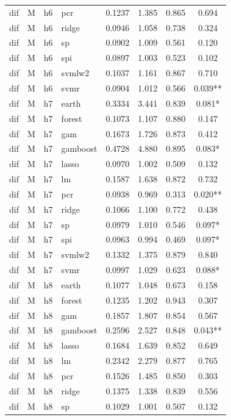 \begin{ThreePartTable}
\begin{longtable}[t]{llclcccc}
dif & M & h6 & pcr & 0.1237 & 1.385 & 0.865 & 0.694\\
dif & M & h6 & ridge & 0.0946 & 1.058 & 0.738 & 0.324\\
dif & M & h6 & sp & 0.0902 & 1.009 & 0.561 & 0.120\\
dif & M & h6 & spi & 0.0897 & 1.003 & 0.523 & 0.102\\
dif & M & h6 & svmlw2 & 0.1037 & 1.161 & 0.867 & 0.710\\
dif & M & h6 & svmr & 0.0904 & 1.012 & 0.566 & 0.039**\\
\addlinespace
dif & M & h7 & earth & 0.3334 & 3.441 & 0.839 & 0.081*\\
dif & M & h7 & forest & 0.1073 & 1.107 & 0.880 & 0.147\\
dif & M & h7 & gam & 0.1673 & 1.726 & 0.873 & 0.412\\
dif & M & h7 & gamboost & 0.4728 & 4.880 & 0.895 & 0.083*\\
dif & M & h7 & lasso & 0.0970 & 1.002 & 0.509 & 0.132\\
dif & M & h7 & lm & 0.1587 & 1.638 & 0.872 & 0.732\\
dif & M & h7 & pcr & 0.0938 & 0.969 & 0.313 & 0.020**\\
dif & M & h7 & ridge & 0.1066 & 1.100 & 0.772 & 0.438\\
dif & M & h7 & sp & 0.0979 & 1.010 & 0.546 & 0.097*\\
dif & M & h7 & spi & 0.0963 & 0.994 & 0.469 & 0.097*\\
dif & M & h7 & svmlw2 & 0.1332 & 1.375 & 0.879 & 0.840\\
dif & M & h7 & svmr & 0.0997 & 1.029 & 0.623 & 0.088*\\
\addlinespace
dif & M & h8 & earth & 0.1077 & 1.048 & 0.673 & 0.158\\
dif & M & h8 & forest & 0.1235 & 1.202 & 0.943 & 0.307\\
dif & M & h8 & gam & 0.1857 & 1.807 & 0.854 & 0.567\\
dif & M & h8 & gamboost & 0.2596 & 2.527 & 0.848 & 0.043**\\
dif & M & h8 & lasso & 0.1684 & 1.639 & 0.852 & 0.649\\
dif & M & h8 & lm & 0.2342 & 2.279 & 0.877 & 0.765\\
dif & M & h8 & pcr & 0.1526 & 1.485 & 0.850 & 0.303\\
dif & M & h8 & ridge & 0.1375 & 1.338 & 0.839 & 0.556\\
dif & M & h8 & sp & 0.1029 & 1.001 & 0.507 & 0.132\\

\end{longtable}
\end{ThreePartTable}
